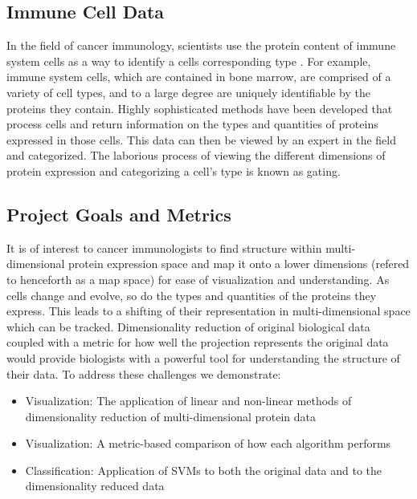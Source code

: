 \documentclass{article}
\begin{document}
\subsection{Immune Cell Data}

In the field of cancer immunology, scientists use the protein content of immune system cells as a way to identify a cells corresponding type \cite{Bendall:2011bm}. For example, immune system cells, which are contained in bone marrow, are comprised of a variety of cell types, and to a large degree are uniquely identifiable by the proteins they contain. Highly sophisticated methods have been developed that process cells and return information on the types and quantities of proteins expressed in those cells. This data can then be viewed by an expert in the field and categorized. The laborious process of viewing the different dimensions of protein expression and categorizing a cell's type is known as gating. 

%

\subsection{Project Goals and Metrics}

It is of interest to cancer immunologists to find structure within multi-dimensional protein expression space and map it onto a lower dimensions (refered to henceforth as a map space) for ease of visualization and understanding. As cells change and evolve, so do the types and quantities of the proteins they express. This leads to a shifting of their representation in multi-dimensional space which can be tracked. Dimensionality reduction of original biological data coupled with a metric for how well the projection represents the original data would provide biologists with a powerful tool for understanding the structure of their data. To address these challenges we demonstrate:

\begin{itemize}
\item Visualization: The application of linear and non-linear methods of dimensionality reduction of multi-dimensional protein data
\item Visualization: A metric-based comparison of how each algorithm performs
\item Classification: Application of SVMs to both the original data and to the dimensionality reduced data
\end{itemize}
\end{document}
